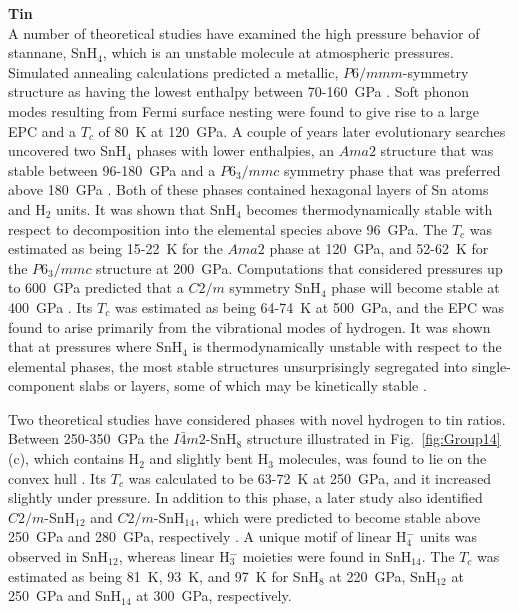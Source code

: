 \documentclass[12pt,letterpaper,oneside]{article}
\begin{document}
\noindent\textbf{Tin} \\
%
A number of theoretical studies have examined the high pressure behavior of stannane, SnH$_4$, which is an unstable molecule at atmospheric pressures. Simulated annealing calculations predicted a metallic, $P6/mmm$-symmetry structure as having the lowest enthalpy between 70-160~GPa \cite{Tse:2007a}. Soft phonon modes resulting from Fermi surface nesting were found to give rise to a large EPC and a $T_c$ of 80~K at 120~GPa. A couple of years later evolutionary searches uncovered two SnH$_4$ phases with lower enthalpies, an $Ama2$ structure that was stable between 96-180~GPa and a $P6_3/mmc$ symmetry phase that was preferred above 180~GPa \cite{Gao:2010a}. Both of these phases contained hexagonal layers of Sn atoms and H$_2$ units. It was shown that SnH$_4$ becomes thermodynamically stable with respect to decomposition into the elemental species above 96~GPa. The $T_c$ was estimated as being 15-22~K for the $Ama2$ phase at 120~GPa, and 52-62~K for the $P6_3/mmc$ structure at 200~GPa. Computations that considered pressures up to 600~GPa predicted that a $C2/m$ symmetry SnH$_4$ phase will become stable at 400~GPa  \cite{Zhang:2016a}. Its $T_c$ was estimated as being 64-74~K at 500~GPa, and the EPC was found to arise primarily from the vibrational modes of hydrogen. It was shown that at pressures where SnH$_4$ is thermodynamically unstable with respect to the elemental phases, the most stable structures unsurprisingly segregated into single-component slabs or layers, some of which may be kinetically stable \cite{Gonzalez:2010-Sn}. 

Two theoretical studies have considered phases with novel hydrogen to tin ratios. Between 250-350~GPa the $I\bar{4}m2$-SnH$_8$ structure illustrated in Fig.\ \ref{fig:Group14}(c), which contains H$_2$ and slightly bent H$_3$ molecules, was found to lie on the convex hull \cite{Zhang:2015a}. Its  $T_c$ was calculated to be 63-72~K at 250~GPa, and it increased slightly under pressure. In addition to this phase, a later study also identified $C2/m$-SnH$_{12}$ and $C2/m$-SnH$_{14}$, which were predicted to become stable above 250~GPa and 280~GPa, respectively \cite{Esfahani:2016}. A unique motif of linear H$_4^-$ units was observed in SnH$_{12}$, whereas linear H$_3^-$ moieties were found in SnH$_{14}$. The $T_c$ was estimated as being 81~K, 93~K, and 97~K for SnH$_8$ at 220~GPa, SnH$_{12}$ at 250~GPa and SnH$_{14}$ at 300~GPa, respectively. \\
\end{document}
